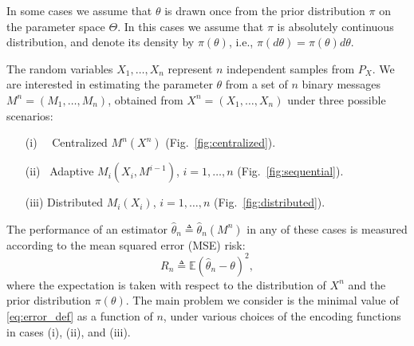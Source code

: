 \documentclass[letterpaper, conference, 11pt]{IEEEtran}      %
\begin{document}
In some cases we assume that $\theta$ is drawn once from the prior distribution $\pi$ on the parameter space $\Theta$. In this cases we assume that $\pi$  
is absolutely continuous distribution, and denote its density by $\pi(\theta)$, i.e., $\pi(d\theta) = \pi(\theta)d\theta$.  
\par
The random variables $X_1,\ldots,X_n$ represent $n$ independent samples from $P_X$. 
We are interested in estimating the parameter $\theta$ from a set of $n$ binary messages $M^n = (M_1,\ldots,M_n)$, obtained from $X^n = (X_1,\ldots,X_n)$ under three possible scenarios: 
\begin{itemize}
\item[(i)~~] Centralized $M^n(X^n)$ (Fig.~\ref{fig:centralized}).
\item[(ii)~] Adaptive $M_i(X_i,M^{i-1})$, $i=1,\ldots,n$ (Fig.~\ref{fig:sequential}).
\item[(iii)] Distributed $M_i(X_i)$, $i=1,\ldots,n$ (Fig.~\ref{fig:distributed}).
\end{itemize}

The performance of an estimator $\hat{\theta}_n \triangleq \hat{\theta}_n(M^n)$ in any of these cases is measured according to the mean squared error (MSE) risk:
\begin{equation}
\label{eq:error_def}
R_n \triangleq \mathbb E\left(\hat{\theta}_n - \theta \right)^2,
\end{equation}
where the expectation is taken with respect to the distribution of $X^n$ and the prior distribution $\pi(\theta)$.  
%
The main problem we consider is the minimal value of \eqref{eq:error_def} as a function of $n$, under various choices of the encoding functions in cases (i), (ii), and (iii). \\
\end{document}
